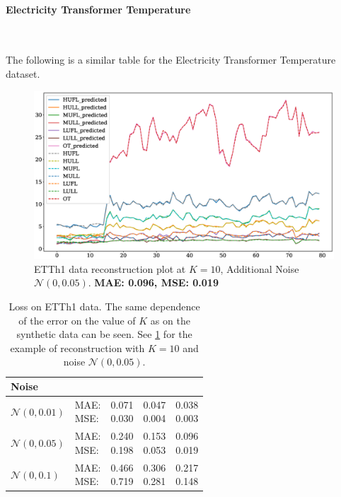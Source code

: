 \documentclass[12pt]{article}
\begin{document}
{\paragraph{Electricity Transformer Temperature}\

The following is a similar table for the Electricity Transformer Temperature dataset.

\begin{figure}[!htbp]
	\centering
	\includegraphics[width=\textwidth]{ETT_time_series_K10N005.eps}
	\caption{ETTh1 data reconstruction plot at $K=10$, Additional Noise $\mathcal{N}(0, 0.05)$. \textbf{MAE: 0.096, MSE: 0.019}}
	\label{fig:fig6}
\end{figure}

\begin{table}[!h]
\def\arraystretch{2.3}
\begin{center}
\caption{Loss on ETTh1 data. The same dependence of the error on the value of $K$ as on the synthetic data can be seen. See \ref{fig:fig6} for the example of reconstruction with $K=10$ and noise $\mathcal{N}(0, 0.05)$.}
\begin{tabular}{|l||l||*{3}{c|}}\hline
	{Noise}
	&\makebox[3em]{Metric}&\makebox[3em]{$K=2$}&\makebox[3em]{$K=4$}&\makebox[3em]{$K=10$}\\\hline
	$\mathcal{N}(0, 0.01)$&\makecell{ MAE: \\ MSE: } &\makecell{ 0.071 \\ 0.030 }&\makecell{ 0.047 \\ 0.004 }&\makecell{ 0.038 \\ 0.003 }\\\hline
	$\mathcal{N}(0, 0.05)$&\makecell{ MAE: \\ MSE: } &\makecell{ 0.240 \\ 0.198 }&\makecell{ 0.153 \\ 0.053 }&\makecell{ 0.096 \\ 0.019 }\\\hline
	$\mathcal{N}(0, 0.1)$& \makecell{ MAE: \\ MSE: } &\makecell{ 0.466 \\ 0.719 }&\makecell{ 0.306 \\ 0.281 }&\makecell{ 0.217 \\ 0.148 }\\\hline
\end{tabular}
\end{center}
\end{table}


}
\end{document}
